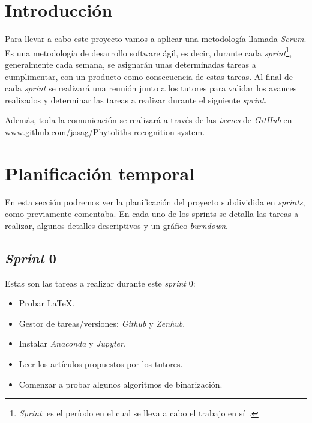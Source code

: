 
\section{Introducción}
Para llevar a cabo este proyecto vamos a aplicar una metodología llamada \textit{Scrum}. Es una metodología de desarrollo software ágil, es decir, durante cada \textit{sprint}\footnote{\textit{Sprint}: es el período en el cual se lleva a cabo el trabajo en sí~\cite{wiki:scrum}.}, generalmente cada semana, se asignarán unas determinadas tareas a cumplimentar, con un producto como consecuencia de estas tareas. Al final de cada \textit{sprint} se realizará una reunión junto a los tutores para validar los avances realizados y determinar las tareas a realizar durante el siguiente \textit{sprint}.

Además, toda la comunicación se realizará a través de las \textit{issues} de \textit{GitHub} en \url{www.github.com/jasag/Phytoliths-recognition-system}.

\section{Planificación temporal}

En esta sección podremos ver la planificación del proyecto subdividida en \textit{sprints}, como previamente comentaba. En cada uno de los sprints se detalla las tareas a realizar, algunos detalles descriptivos y un gráfico \textit{burndown}.


\subsection{\textit{Sprint} 0}
Estas son las tareas a realizar durante este \textit{sprint} 0:

\begin{itemize}
	\item Probar \LaTeX.
	\item Gestor de tareas/versiones: \textit{Github} y \textit{Zenhub}.
	\item Instalar \textit{Anaconda} y \textit{Jupyter}.
	\item Leer los artículos propuestos por los tutores.
	\item Comenzar a probar algunos algoritmos de binarización.
\end{itemize}

